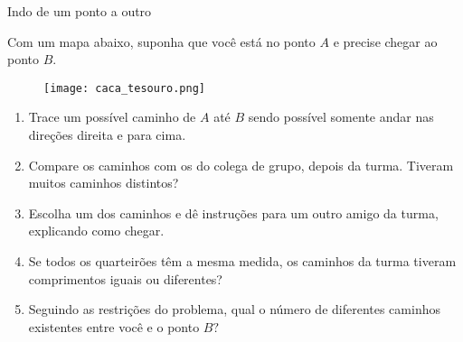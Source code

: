\begin{task}{Indo de um ponto a outro}

Com um mapa abaixo, suponha que você está no ponto $A$ e precise chegar ao ponto $B.$ 

\begin{figure}[H]
\centering

\texttt{[image: caca\_tesouro.png]}
\end{figure}

\begin{enumerate}
\item Trace um possível caminho de $A$ até $B$ sendo possível somente andar nas  direções direita e para cima.
\item Compare os caminhos com os do colega de grupo, depois da turma. Tiveram muitos caminhos distintos?
\item Escolha um dos caminhos e dê instruções para um outro amigo da turma, explicando como chegar. 
\item Se todos os quarteirões têm a mesma medida, os caminhos da turma tiveram comprimentos iguais ou diferentes?
\item Seguindo as restrições do problema, qual o número de diferentes caminhos existentes entre você e o ponto $B?$ 

\end{enumerate} 

\end{task}
\clearpage

